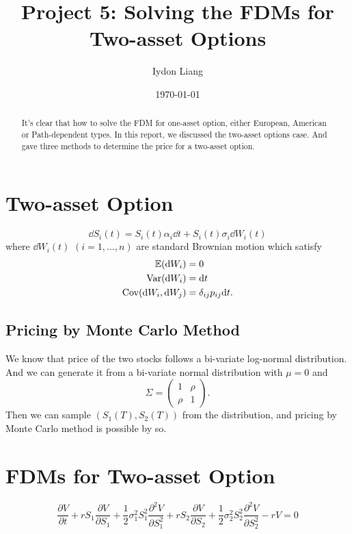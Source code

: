 \title{Project 5: Solving the FDMs for Two-asset Options}
\author{Iydon Liang}
\date{\today}

\maketitle\tableofcontents\clearpage

\begin{abstract}
    It's clear that how to solve the FDM for one-asset option, either European, American or Path-dependent types. In this report, we discussed the two-asset options case. And gave three methods to determine the price for a two-asset option.
\end{abstract}

\section{Two-asset Option}
\[
    \dd S_i(t) = S_i(t)\alpha_i\dd t + S_i(t)\sigma_i\dd W_i(t)
\]
where $\dd W_i(t)$ $(i=1,\ldots,n)$ are standard Brownian motion which satisfy
\[
    \begin{aligned}
        \mathbb{E}(\mathrm{d} W_i) &= 0 \\
        \mathrm{Var}(\mathrm{d} W_i) &= \mathrm{d} t \\
        \mathrm{Cov}(\mathrm{d} W_i, \mathrm{d} W_j) &= \delta_{ij} p_{ij} \mathrm{d} t.
    \end{aligned}
\]

\subsection{Pricing by Monte Carlo Method}
We know that price of the two stocks follows a bi-variate log-normal distribution. And we can generate it from a bi-variate normal distribution with $\mu=0$ and
\[
    \Sigma = \begin{pmatrix}
        1 & \rho \\
        \rho & 1
    \end{pmatrix}.
\]
Then we can sample $(S_1(T), S_2(T))$ from the distribution, and pricing by Monte Carlo method is possible by so.



\section{FDMs for Two-asset Option}
\[
    \frac{\partial V}{\partial t} + rS_1\frac{\partial V}{\partial S_1} + \frac{1}{2}\sigma_1^2S_1^2\frac{\partial^2 V}{\partial S_1^2} + rS_2\frac{\partial V}{\partial S_2} + \frac{1}{2}\sigma_2^2S_2^2\frac{\partial^2 V}{\partial S_2^2} - rV = 0
\]

